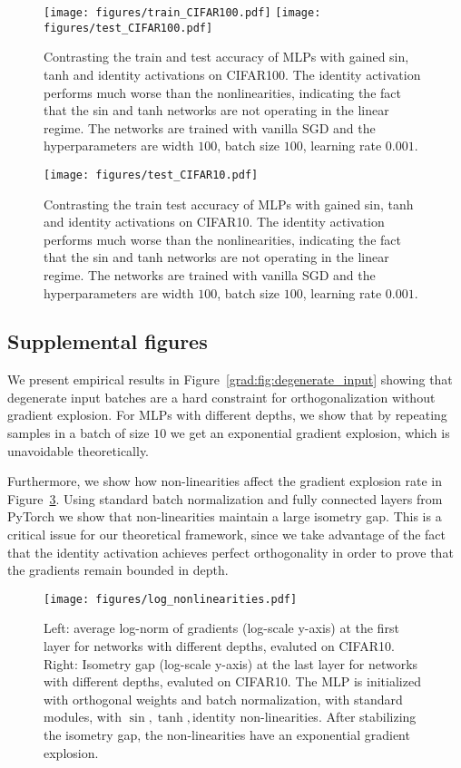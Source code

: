 \begin{figure}[ht]
    \centering
    \texttt{[image: figures/train\_CIFAR100.pdf]}
    \texttt{[image: figures/test\_CIFAR100.pdf]}
    \caption{Contrasting the train and test accuracy of MLPs with gained sin, tanh and identity activations on CIFAR100. The identity activation performs much worse than the nonlinearities, indicating the fact that the sin and tanh networks are not operating in the linear regime. The networks are trained with vanilla SGD and the hyperparameters are width $100$, batch size $100$, learning rate $0.001$.}
    \label{grad:fig:cifar100}
\end{figure}

\begin{figure}[ht]
    \centering
    \texttt{[image: figures/test\_CIFAR10.pdf]}
    \caption{Contrasting the train test accuracy of MLPs with gained sin, tanh and identity activations on CIFAR10. The identity activation performs much worse than the nonlinearities, indicating the fact that the sin and tanh networks are not operating in the linear regime. The networks are trained with vanilla SGD and the hyperparameters are width $100$, batch size $100$, learning rate $0.001$.}
    \label{grad:fig:cifar10_test}
\end{figure}

\subsection*{Supplemental figures}
We present empirical results in Figure~\ref{grad:fig:degenerate_input} showing that degenerate input batches are a hard constraint for orthogonalization without gradient explosion. For MLPs with different depths, we show that by repeating samples in a batch of size $10$ we get an exponential gradient explosion, which is unavoidable theoretically.



Furthermore, we show how non-linearities affect the gradient explosion rate in Figure~\ref{grad:fig:nonlinear_contrast}. Using standard batch normalization and fully connected layers from PyTorch we show that non-linearities maintain a large isometry gap. This is a critical issue for our theoretical framework, since we take advantage of the fact that the identity activation achieves perfect orthogonality in order to prove that the gradients remain bounded in depth.
\begin{figure}[ht]
    \centering
    \texttt{[image: figures/log\_nonlinearities.pdf]}
    \vspace{-.4cm}
    \caption{Left: average log-norm of gradients (log-scale y-axis) at the first layer for networks with different depths, evaluted on CIFAR10. Right: Isometry gap (log-scale y-axis) at the last layer for networks with different depths, evaluted on CIFAR10. The MLP is initialized with orthogonal weights and batch normalization, with standard modules, with $\sin, \tanh, \text{identity}$ non-linearities. After stabilizing the isometry gap, the non-linearities have an exponential gradient explosion.
    }
    \label{grad:fig:nonlinear_contrast} 
\end{figure}

